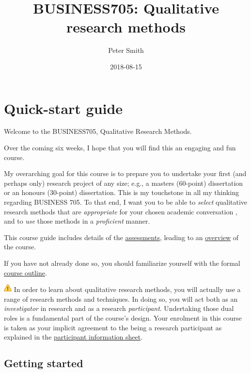 \documentclass[]{book}
\title{BUSINESS705: Qualitative research methods}
\author{Peter Smith}
\date{2018-08-15}
\theoremstyle{definition}
\theoremstyle{definition}
\theoremstyle{definition}
\theoremstyle{remark}
\begin{document}
\maketitle

{
\setcounter{tocdepth}{1}
\tableofcontents
}
\hypertarget{quick-start-guide}{%
\chapter*{Quick-start guide}\label{quick-start-guide}}

Welcome to the BUSINESS705, Qualitative Research Methods.

Over the coming six weeks, I hope that you will find this an engaging
and fun course.

My overarching goal for this course is to prepare you to undertake your
first (and perhaps only) research project of any size; e.g., a masters
(60-point) dissertation or an honours (30-point) dissertation. This is
my touchstone in all my thinking regarding BUSINESS 705. To that end, I
want you to be able to \emph{select} qualitative research methods that
are \emph{appropriate} for your chosen academic conversation
\autocite{huff_2009_designingresearchpublication}, and to \emph{use}
those methods in a \emph{proficient} manner.

This course guide includes details of the
\protect\hyperlink{assessment-overview}{assessments}, leading to an
\protect\hyperlink{course-overview}{overview} of the course.

If you have not already done so, you should familiarize yourself with
the formal \protect\hyperlink{course-outline}{course outline}.

\includegraphics{images/warning.png} In order to learn about qualitative
research methods, you will actually use a range of research methods and
techniques. In doing so, you will act both as an \emph{investigator} in
research and as a research \emph{participant}. Undertaking those dual
roles is a fundamental part of the course's design. Your enrolment in
this course is taken as your implicit agreement to the being a research
participant as explained in the \protect\hyperlink{pis}{participant
information sheet}.

\hypertarget{getting-started}{%
\section*{Getting started}\label{getting-started}}
\end{document}
